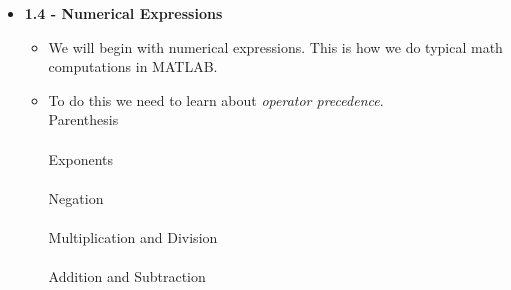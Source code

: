 \documentclass[11pt]{article}
\begin{document}
\begin{itemize}
\begin{itemize}
		\end{itemize}
	\newpage
	\item \textbf{ \LARGE 1.4 - Numerical Expressions}
		\begin{itemize}
			\item \Large{We will begin with numerical expressions. This is how we do typical math computations in MATLAB.} \vspace{10mm}

			\item To do this we need to learn about {\it operator precedence}. \\


				\scalebox{2}{$(\hspace{3mm} )$} \hspace{15mm}\Large{Parenthesis} \\\\

				\scalebox{2}{$\wedge$} \hspace{15mm}\Large{Exponents} \\\\

				\scalebox{2}{$-$} \hspace{15mm}\Large{Negation} \\\\

				\scalebox{2}{$*\hspace{3mm} /$} \hspace{15mm}\Large{Multiplication and Division}\\\\				
	
				 \scalebox{2}{$+\hspace{3mm} -$} \hspace{15mm}\Large{Addition and Subtraction}\\\\
				
		
				
		\end{itemize}


\end{itemize}
\end{document}
